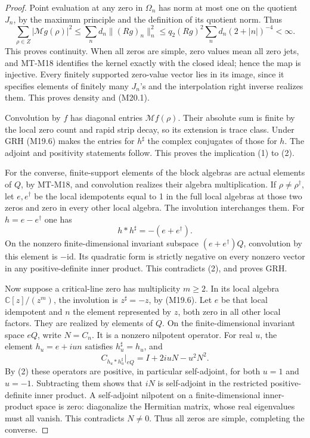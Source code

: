 \documentclass[11pt,a4paper]{article}
\begin{document}
\begin{proof}
Point evaluation at any zero in \(\Omega_n\) has norm at
most one on the quotient \(J_n\), by the maximum principle
and the definition of its quotient norm. Thus
\[
 \sum_{\rho\in Z}|\mathcal Mg(\rho)|^2
 \le\sum_n d_n\|(Rg)_n\|_n^2
 \le q_2(Rg)^2\sum_n d_n(2+|n|)^{-4}<\infty.           \tag{M20.2}
\]
This proves continuity. When all zeros are simple, zero
values mean all zero jets, and MT-M18 identifies the kernel
exactly with the closed ideal; hence the map is injective.
Every finitely supported zero-value vector lies in its
image, since it specifies elements of finitely many
\(J_n\)'s and the interpolation right inverse realizes
them. This proves density and (M20.1).

Convolution by \(f\) has diagonal entries
\(\mathcal Mf(\rho)\). Their absolute sum is finite by
the local zero count and rapid strip decay, so its extension
is trace class. Under GRH (M19.6) makes the entries for
\(h^\sharp\) the complex conjugates of those for \(h\).
The adjoint and positivity statements follow. This proves
the implication (1) to (2).

For the converse, finite-support elements of the block
algebras are actual elements of \(Q\), by MT-M18, and
convolution realizes their algebra multiplication. If
\(\rho\ne\rho^\dagger\), let \(e,e^\dagger\) be the
local idempotents equal to 1 in the full local algebras
at those two zeros and zero in every other local algebra.
The involution interchanges them. For \(h=e-e^\dagger\)
one has
\[
                  h*h^\sharp=-(e+e^\dagger).
\]
On the nonzero finite-dimensional invariant subspace
\((e+e^\dagger)Q\), convolution by this element is
\(-\mathrm{id}\). Its quadratic form is strictly negative
on every nonzero vector in any positive-definite inner
product. This contradicts (2), and proves GRH.

Now suppose a critical-line zero has multiplicity
\(m\ge2\). In its local algebra
\(\mathbb C[z]/(z^m)\), the involution is
\(z^\sharp=-z\), by (M19.6). Let \(e\) be that local
idempotent and \(n\) the element represented by \(z\),
both zero in all other local factors. They are realized
by elements of \(Q\). On the finite-dimensional invariant
space \(eQ\), write \(N=C_n\). It is a nonzero nilpotent
operator. For real \(u\), the element \(h_u=e+iun\)
satisfies \(h_u^\sharp=h_u\), and
\[
 C_{h_u*h_u^\sharp}|_{eQ}
                     =I+2iuN-u^2N^2.                \tag{M20.3}
\]
By (2) these operators are positive, in particular
self-adjoint, for both \(u=1\) and \(u=-1\).
Subtracting them shows that \(iN\) is self-adjoint
in the restricted positive-definite inner product.
A self-adjoint nilpotent on a finite-dimensional
inner-product space is zero: diagonalize the Hermitian
matrix, whose real eigenvalues must all vanish.
This contradicts \(N\ne0\). Thus all zeros are simple,
completing the converse.
\end{proof}
\end{document}
